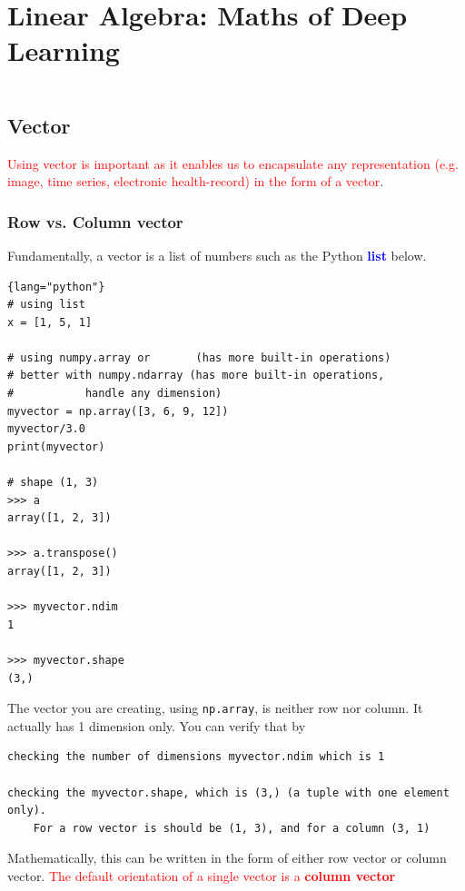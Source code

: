 
\chapter{Linear Algebra: Maths of Deep Learning}

\lstset{language=python}          

$$
\newcommand\bs[1]{\boldsymbol{#1}}
\newcommand\norm[1]{\left\lVert#1\right\rVert}
$$


\section{Vector}
\label{sec:math-vectors}

\textcolor{red}{Using vector is important as it enables us to encapsulate any
representation (e.g. image, time series, electronic health-record) in the form
of a vector}.

\subsection{Row vs. Column vector}

Fundamentally, a vector is a list of numbers such as the Python \textcolor{blue}{\bf list} below.
\begin{lstlisting}{lang="python"}
# using list
x = [1, 5, 1]

# using numpy.array or       (has more built-in operations)
# better with numpy.ndarray (has more built-in operations, 
#   		handle any dimension)
myvector = np.array([3, 6, 9, 12])
myvector/3.0
print(myvector)

# shape (1, 3)
>>> a
array([1, 2, 3])

>>> a.transpose()
array([1, 2, 3])

>>> myvector.ndim
1

>>> myvector.shape
(3,)
\end{lstlisting}

The vector you are creating, using \verb!np.array!, is neither row nor column. It actually has 1 dimension only. You can verify that by
{\tiny
\begin{verbatim}
checking the number of dimensions myvector.ndim which is 1

checking the myvector.shape, which is (3,) (a tuple with one element only). 
	For a row vector is should be (1, 3), and for a column (3, 1)
\end{verbatim}
}

Mathematically, this can be written in the form of either row vector or column vector.
\textcolor{red}{The default orientation of a single vector is a {\bf column vector}}

